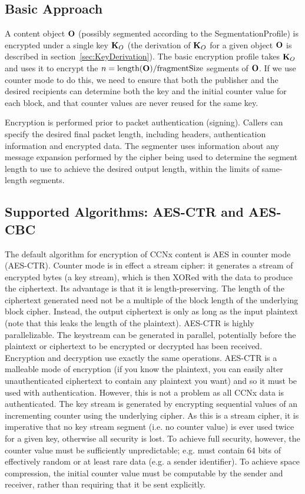 \subsection{Basic Approach}

A content object ${\textbf{O}}$ (possibly segmented according to the
SegmentationProfile) is encrypted under a single key ${\textbf{K}_O}$ (the
derivation of ${\textbf{K}_O}$ for a given object ${\textbf{O}}$ is described in
section~\ref{sec:KeyDerivation}). The basic encryption profile takes
${\textbf{K}_O}$ and uses it to encrypt the
$n=\mbox{length}({\textbf{O}})/\mbox{fragmentSize}$ segments of ${\textbf{O}}$. If we
use counter mode to do this, we need to ensure that both the publisher
and the desired recipients can determine both the key and the initial
counter value for each block, and that counter values are never reused
for the same key.

Encryption is performed prior to packet authentication
(signing). Callers can specify the desired final packet length,
including headers, authentication information and encrypted data. The
segmenter uses information about any message expansion performed by
the cipher being used to determine the segment length to use to
achieve the desired output length, within the limits of same-length
segments.


\subsection{Supported Algorithms: AES-CTR and AES-CBC}

The default algorithm for encryption of CCNx content is AES in counter
mode (AES-CTR). Counter mode is in effect a stream cipher: it
generates a stream of encrypted bytes (a key stream), which is then
XORed with the data to produce the ciphertext. Its advantage is that
it is length-preserving. The length of the ciphertext generated need
not be a multiple of the block length of the underlying block
cipher. Instead, the output ciphertext is only as long as the input
plaintext (note that this leaks the length of the plaintext). AES-CTR
is highly parallelizable. The keystream can be generated in parallel,
potentially before the plaintext or ciphertext to be encrypted or
decrypted has been received. Encryption and decryption use exactly the
same operations. AES-CTR is a malleable mode of encryption (if you
know the plaintext, you can easily alter unauthenticated ciphertext to
contain any plaintext you want) and so it must be used with
authentication. However, this is not a problem as all CCNx data is
authenticated. The key stream is generated by encrypting sequential
values of an incrementing counter using the underlying cipher. As this
is a stream cipher, it is imperative that no key stream segment
(i.e. no counter value) is ever used twice for a given key, otherwise
all security is lost. To achieve full security, however, the counter
value must be sufficiently unpredictable; e.g. must contain 64 bits of
effectively random or at least rare data (e.g. a sender
identifier). To achieve space compression, the initial counter value
must be computable by the sender and receiver, rather than requiring
that it be sent explicitly.

